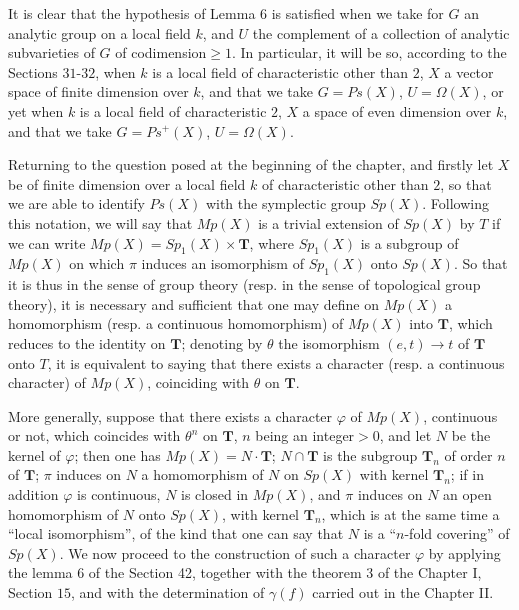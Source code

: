 \documentclass[12pt]{amsart}
\newcounter{ssection}
\renewcommand{\subsection}{
  \addtocounter{ssection}{1}{\bf  \arabic{ssection}.\  }}
\begin{document}
It is clear that the hypothesis of Lemma $6$ is satisfied when we
take for $G$ an analytic group on a local field $k$, and $U$ the
complement of a collection of analytic subvarieties of $G$ of codimension$\geq1$.
In particular, it will be so, according to the Sections $31$-$32$,
when $k$ is a local field of characteristic other than $2$, $X$
a vector space of finite dimension over $k$, and that we take $G=Ps(X)$,
$U=\Omega(X)$, or yet when $k$ is a local field of characteristic
$2$, $X$ a space of even dimension over $k$, and that we take $G=Ps^{+}(X)$,
$U=\Omega(X)$.


\subsection{}
Returning to the question posed at the beginning of the chapter, and
firstly let $X$ be of finite dimension over a local field $k$ of
characteristic other than $2$, so that we are able to identify $Ps(X)$
with the symplectic group $Sp(X)$. Following this notation, we will
say that $Mp(X)$ is a trivial extension of $Sp(X)$ by $T$ if we
can write $Mp(X)=Sp_{1}(X)\times\mathbf{T}$, where $Sp_{1}(X)$ is
a subgroup of $Mp(X)$ on which $\pi$ induces an isomorphism of $Sp_{1}(X)$
onto $Sp(X)$. So that it is thus in the sense of group theory (resp.
in the sense of topological group theory), it is necessary and sufficient
that one may define on $Mp(X)$ a homomorphism (resp. a continuous
homomorphism) of $Mp(X)$ into $\mathbf{T}$, which reduces to the
identity on $\mathbf{T}$; denoting by $\theta$ the isomorphism $(e,t)\to t$
of $\mathbf{T}$ onto $T$, it is equivalent to saying that there
exists a character (resp. a continuous character) of $Mp(X)$, coinciding
with $\theta$ on $\mathbf{T}$.

More generally, suppose that there exists a character $\varphi$ of
$Mp(X)$, continuous or not, which coincides with $\theta^{n}$ on
$\mathbf{T}$, $n$ being an integer$>0$, and let $N$ be the kernel
of $\varphi$; then one has $Mp(X)=N\cdot\mathbf{T}$; $N\cap\mathbf{T}$
is the subgroup $\mathbf{T}_{n}$ of order $n$ of $\mathbf{T}$;
$\pi$ induces on $N$ a homomorphism of $N$ on $Sp(X)$ with kernel
$\mathbf{T}_{n}$; if in addition $\varphi$ is continuous, $N$ is
closed in $Mp(X)$, and $\pi$ induces on $N$ an open homomorphism
of $N$ onto $Sp(X)$, with kernel $\mathbf{T}_{n}$, which is at
the same time a {}``local isomorphism'', of the kind that one can
say that $N$ is a {}``$n$-fold covering'' of $Sp(X)$. We now
proceed to the construction of such a character $\varphi$ by applying
the lemma $6$ of the Section 42, together with the theorem $3$ of
the Chapter I, Section $15$, and with the determination of $\gamma(f)$
carried out in the Chapter II.
\end{document}

